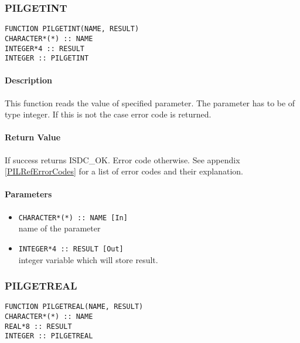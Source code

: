 
\subsubsection{PILGETINT}

\begin{verbatim}
FUNCTION PILGETINT(NAME, RESULT) 
CHARACTER*(*) :: NAME 
INTEGER*4 :: RESULT 
INTEGER :: PILGETINT
\end{verbatim}

\paragraph{Description\\}
This function reads the value of specified parameter. The parameter has to
be of type integer. If this is not the
case error code is returned. 

\paragraph{Return Value\\}
If success returns ISDC\_OK. Error code otherwise. See appendix \ref{PILRefErrorCodes}
for a list of error codes and their explanation.

\paragraph{Parameters}
\begin{itemize}
\item
{\tt CHARACTER*(*) :: NAME [In] } \\
name of the parameter 
\item
{\tt INTEGER*4 :: RESULT [Out] } \\
integer variable which will store result.
\end{itemize}



\subsubsection{PILGETREAL}

\begin{verbatim}
FUNCTION PILGETREAL(NAME, RESULT) 
CHARACTER*(*) :: NAME 
REAL*8 :: RESULT 
INTEGER :: PILGETREAL
\end{verbatim}

